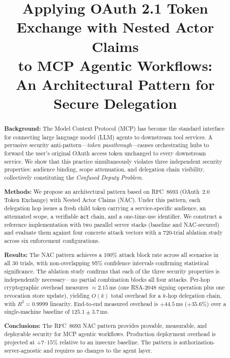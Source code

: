 \documentclass[journal]{IEEEtran}
\begin{document}
\title{Applying OAuth 2.1 Token Exchange with Nested Actor Claims\\
to MCP Agentic Workflows:\\
An Architectural Pattern for Secure Delegation}

\author{
}

\maketitle

\begin{abstract}
\textbf{Background:}
The Model Context Protocol (MCP) has become the standard interface for connecting
large language model (LLM) agents to downstream tool services. A pervasive
security anti-pattern---\textit{token passthrough}---causes orchestrating hubs to
forward the user's original OAuth access token unchanged to every downstream
service. We show that this practice simultaneously violates three independent
security properties: audience binding, scope attenuation, and delegation chain
visibility, collectively constituting the \textit{Confused Deputy Problem}.

\textbf{Methods:}
We propose an architectural pattern based on RFC~8693 (OAuth~2.0 Token Exchange)
with Nested Actor Claims (NAC). Under this pattern, each delegation hop issues a
fresh child token carrying a service-specific audience, an attenuated scope, a
verifiable \texttt{act} chain, and a one-time-use identifier. We construct a
reference implementation with two parallel server stacks (baseline and NAC-secured)
and evaluate them against four concrete attack vectors with a 720-trial ablation
study across six enforcement configurations.

\textbf{Results:}
The NAC pattern achieves a 100\% attack block rate across all scenarios in all
30 trials, with non-overlapping 95\% confidence intervals confirming statistical
significance. The ablation study confirms that each of the three security
properties is independently necessary---no partial combination blocks all four
attacks. Per-hop cryptographic overhead measures $\approx 2.15$\,ms (one
RSA-2048 signing operation plus one revocation store update), yielding $O(k)$
total overhead for a $k$-hop delegation chain, with $R^2 = 0.9999$ linearity.
End-to-end measured overhead is $+44.5$\,ms ($+35.6\%$) over a single-machine
baseline of $125.1 \pm 3.7$\,ms.

\textbf{Conclusions:}
The RFC~8693 NAC pattern provides provable, measurable, and deployable security
for MCP agentic workflows. Production deployment overhead is projected at
$+7$--$15\%$ relative to an insecure baseline. The pattern is
authorization-server-agnostic and requires no changes to the agent layer.
\end{abstract}
\end{document}
